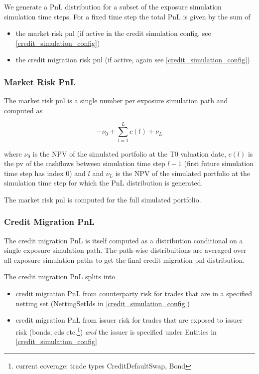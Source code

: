 \documentclass[12pt, a4paper]{article}
\begin{document}
We generate a PnL distribution for a subset of the exposure simulation simulation time steps. For a fixed time step the
total PnL is given by the sum of

\begin{itemize}
\item the market risk pnl (if active in the credit simulation config, see \ref{credit_simulation_config})
\item the credit migration risk pnl (if active, again see \ref{credit_simulation_config})
\end{itemize}

\subsubsection{Market Risk PnL}

The market risk pnl is a single number per exposure simulation path and computed as

\begin{equation}
-\nu_0 + \sum_{l=1}^L c(l) + \nu_L
\end{equation}

where $\nu_0$ is the NPV of the simulated portfolio at the T0 valuation date, $c(l)$ is the pv of the cashflows between
simulation time step $l-1$ (first future simulation time step has index 0) and $l$ and $\nu_L$ is the NPV of the
simulated portfolio at the simulation time step for which the PnL distribution is generated.

The market risk pnl is computed for the full simulated portfolio.

\subsubsection{Credit Migration PnL}

The credit migration PnL is itself computed as a distribution conditional on a single exposure simulation path. The path-wise distribuitions are averaged over all exposure simulation paths to get the final credit migration pnl distribution.

The credit migration PnL splits into

\begin{itemize}
\item credit migration PnL from counterparty risk for trades that are in a specified netting set (NettingSetIds in \ref{credit_simulation_config})
\item credit migration PnL from issuer risk for trades that are exposed to issuer risk (bonds, cds etc.\footnote{current
coverage: trade types CreditDefaultSwap, Bond}) {\em and} the issuer is specified under Entities in
  \ref{credit_simulation_config}
\end{itemize}
\end{document}
